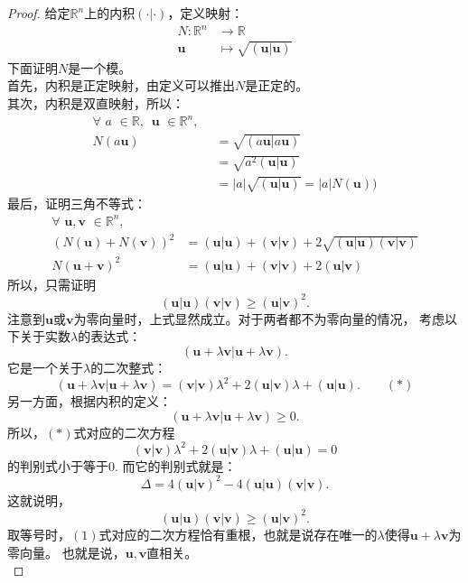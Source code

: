 \documentclass[12pt,UTF8]{ctexbook}
\begin{document}
\begin{proof} %
    给定$\mathbb{R}^n$上的内积$(\cdot | \cdot)$，定义映射：
    \begin{align*}
        N : \mathbb{R}^n &\rightarrow \mathbb{R}  \\
        \mathbf{u} & \mapsto  \sqrt{(\mathbf{u} | \mathbf{u})} 
    \end{align*}
    下面证明$N$是一个模。\\
    首先，内积是正定映射，由定义可以推出$N$是正定的。\\
    其次，内积是双直映射，所以：
    \begin{align*}
        \forall \,\, a \,\, \in \mathbb{R}, \,\,\,  \mathbf{u} \,\, \in \mathbb{R}^n, \,\,\,  \\
        N(a\mathbf{u}) &= \sqrt{(a\mathbf{u} | a\mathbf{u})}  \\
        &= \sqrt{a^2(\mathbf{u} | \mathbf{u})}  \\
        &= |a| \sqrt{(\mathbf{u} | \mathbf{u})} = |a|N(\mathbf{u}))
    \end{align*}
    最后，证明三角不等式：
    \begin{align*}
        \forall \,\, \mathbf{u} ,  \mathbf{v} \,\, \in \mathbb{R}^n, \,\,\,  \\
        (N(\mathbf{u}) + N(\mathbf{v}))^2 &= (\mathbf{u} | \mathbf{u}) + (\mathbf{v} | \mathbf{v}) + 2\sqrt{(\mathbf{u} | \mathbf{u})(\mathbf{v} | \mathbf{v})}  \\
        N(\mathbf{u}+\mathbf{v})^2 &= (\mathbf{u} | \mathbf{u}) + (\mathbf{v} | \mathbf{v}) + 2(\mathbf{u} | \mathbf{v}) 
    \end{align*}
    所以，只需证明
    $$ (\mathbf{u} | \mathbf{u})(\mathbf{v} | \mathbf{v}) \geqslant (\mathbf{u} | \mathbf{v})^2. $$
    注意到$\mathbf{u}$或$\mathbf{v}$为零向量时，上式显然成立。对于两者都不为零向量的情况，
    考虑以下关于实数$\lambda$的表达式：
    $$ (\mathbf{u}+ \lambda\mathbf{v} |\mathbf{u}+ \lambda\mathbf{v} ). $$
    它是一个关于$\lambda$的二次整式：
    $$ (\mathbf{u}+ \lambda\mathbf{v} |\mathbf{u}+ \lambda\mathbf{v} ) = (\mathbf{v} | \mathbf{v}) \lambda^2 + 2 (\mathbf{u} | \mathbf{v}) \lambda + (\mathbf{u} | \mathbf{u}). \quad\quad (*)$$
    另一方面，根据内积的定义：
    $$ (\mathbf{u}+ \lambda\mathbf{v} |\mathbf{u}+ \lambda\mathbf{v} ) \geqslant 0.$$
    所以，$(*)$式对应的二次方程
    $$  (\mathbf{v} | \mathbf{v}) \lambda^2 + 2 (\mathbf{u} | \mathbf{v}) \lambda + (\mathbf{u} | \mathbf{u}) = 0  $$
    的判别式小于等于0. 而它的判别式就是：
    $$ \Delta = 4 (\mathbf{u} | \mathbf{v})^2 - 4 (\mathbf{u} | \mathbf{u}) (\mathbf{v} | \mathbf{v}). $$
    这就说明，
    $$ (\mathbf{u} | \mathbf{u})(\mathbf{v} | \mathbf{v}) \geqslant (\mathbf{u} | \mathbf{v})^2. $$
    取等号时，$(1)$式对应的二次方程恰有重根，也就是说存在唯一的$\lambda$使得$\mathbf{u}+ \lambda\mathbf{v}$为零向量。
    也就是说，$\mathbf{u}, \mathbf{v}$直相关。\\     
\end{proof}
\end{document}
